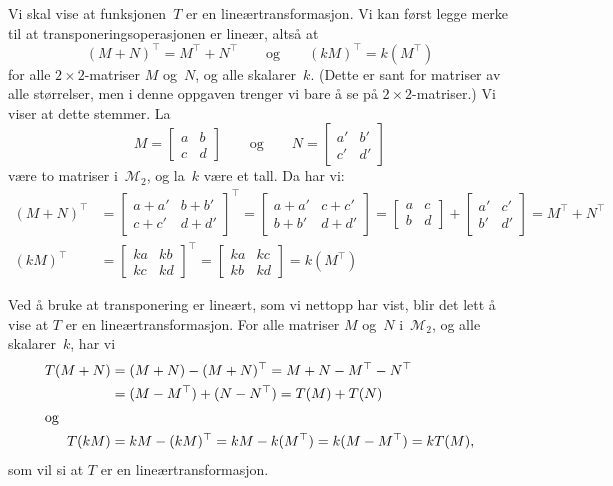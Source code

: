\documentclass[notitlepage,a4paper,12pt,norsk]{IMFeksamen}
\newcommand{\M}{\mathcal{M}} %
\newcommand{\tr}{^\top}
\newcommand{\0}{\V{0}}
\newcommand{\oppgslutt}{
\begin{center}
\pgfornament[width=6cm]{88}
\end{center}
}
\newenvironment{losning}{\begin{oppgave}}{\oppgslutt\end{oppgave}}
\begin{document}
\begin{losning}
Vi skal vise at funksjonen~$T$ er en lineærtransformasjon.
Vi kan først legge merke til at transponeringsoperasjonen er lineær,
altså at
\[
(M + N)\tr = M\tr + N\tr
\qquad
\text{og}
\qquad
(kM)\tr = k (M\tr)
\]
for alle $2 \times 2$-matriser $M$ og~$N$,
og alle skalarer~$k$.
(Dette er sant for matriser av alle størrelser,
men i denne oppgaven trenger vi bare å se på $2 \times 2$-matriser.)
Vi viser at dette stemmer.
La
\[
M =
\begin{bmatrix}
a & b \\
c & d
\end{bmatrix}
\qquad\text{og}\qquad
N =
\begin{bmatrix}
a' & b' \\
c' & d'
\end{bmatrix}
\]
være to matriser i~$\M_2$, og la~$k$ være et tall.
Da har vi:
\begin{align*}
(M + N)\tr
&=
\begin{bmatrix}
a + a' & b + b' \\
c + c' & d + d'
\end{bmatrix}
\tr
=
\begin{bmatrix}
a + a' & c + c' \\
b + b' & d + d'
\end{bmatrix}
=
\begin{bmatrix}
a & c \\
b & d
\end{bmatrix}
+
\begin{bmatrix}
a' & c' \\
b' & d'
\end{bmatrix}
= M\tr + N\tr
\\
(kM)\tr
&=
\begin{bmatrix}
ka & kb \\
kc & kd
\end{bmatrix}
\tr
=
\begin{bmatrix}
ka & kc \\
kb & kd
\end{bmatrix}
= k (M\tr)
\end{align*}

Ved å bruke at transponering er lineært,
som vi nettopp har vist,
blir det lett å vise at $T$ er en lineærtransformasjon.
For alle matriser $M$ og~$N$ i~$\M_2$, og alle skalarer~$k$, har vi
\begin{align*}
T(M + N)
&= (M + N) - (M + N)\tr
 = M + N - M\tr - N\tr \\
&= (M - M\tr) + (N - N\tr)
 = T(M) + T(N) \\
\intertext{og}
T(kM)
&= kM - (kM)\tr
 = kM - k (M\tr)
 = k (M - M\tr)
 = k T(M),
\end{align*}
som vil si at $T$ er en lineærtransformasjon.


\end{losning}
\end{document}
